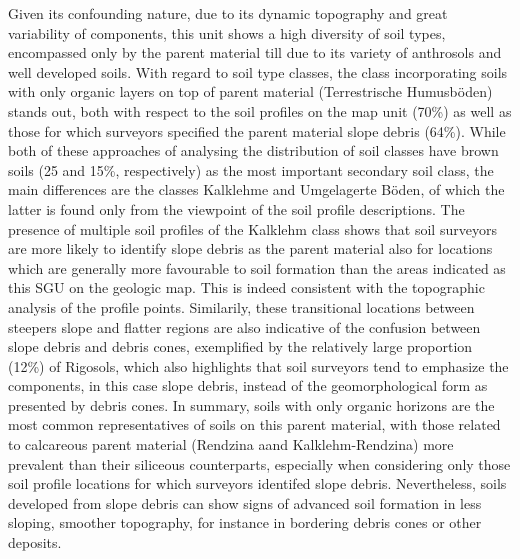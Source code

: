 \documentclass[preprint,12pt,authoryear]{elsarticle}
\begin{document}
Given its confounding nature, due to its dynamic topography and  great variability of components, this unit shows a high diversity of soil types, encompassed only by the parent material till due to its variety of anthrosols and well developed soils.  With regard to soil type classes, the class incorporating soils with only organic layers on top of parent material (Terrestrische Humusb\"oden) stands out, both with respect to the soil profiles on the map unit (70\%) as well as those for which surveyors specified the parent material slope debris (64\%). While both of these approaches of analysing the distribution of soil classes have brown soils (25 and 15\%, respectively) as the most important secondary soil class, the main differences are the classes Kalklehme and Umgelagerte B\"oden, of which the latter is found only from the viewpoint of the soil profile descriptions. The presence of multiple soil profiles of the Kalklehm class shows that soil surveyors are more likely to identify slope debris as the parent material also for locations which are generally more favourable to soil formation than the areas indicated as this SGU on the geologic map. This is indeed consistent with the topographic analysis of the profile points. Similarily, these transitional locations between steepers slope and flatter regions are also indicative of the confusion between slope debris and debris cones, exemplified by the relatively large proportion (12\%) of Rigosols, which also highlights that soil surveyors tend to emphasize the components, in this case slope debris, instead of the geomorphological form as presented by debris cones. In summary, soils with only organic horizons are the most common representatives of soils on this parent material, with those related to calcareous parent material (Rendzina aand Kalklehm-Rendzina) more prevalent than their siliceous counterparts, especially when considering only those soil profile locations for which surveyors identifed slope debris. Nevertheless, soils developed from slope debris can show signs of advanced soil formation in less sloping, smoother topography, for instance in bordering debris cones or other deposits. 
\end{document}
